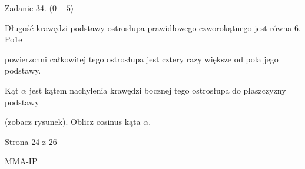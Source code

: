 \documentclass[a4paper,12pt]{article}
\begin{document}
Zadanie 34. $(0-5\rangle$

Długość krawędzi podstawy ostrosłupa prawidłowego czworokątnego jest równa 6. Po1e

powierzchni całkowitej tego ostrosłupa jest cztery razy większe od pola jego podstawy.

Kąt $\alpha$ jest kątem nachylenia krawędzi bocznej tego ostrosłupa do płaszczyzny podstawy

(zobacz rysunek). Oblicz cosinus kąta $\alpha.$

Strona 24 z 26

MMA-IP
\end{document}

